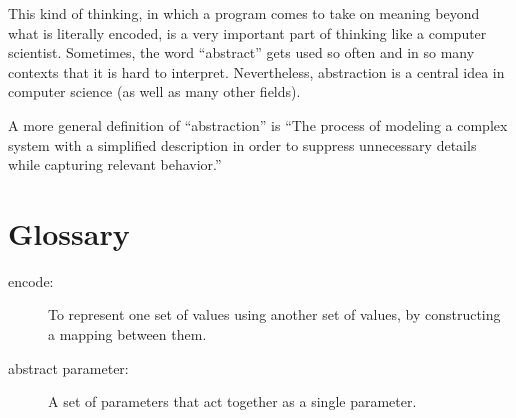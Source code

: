 This kind of thinking, in which a program comes to take on meaning
beyond what is literally encoded, is a very important part of thinking
like a computer scientist.  Sometimes, the word ``abstract'' gets used
so often and in so many contexts that it is hard to interpret.
Nevertheless, abstraction is a central idea in computer science (as
well as many other fields).


A more general definition of ``abstraction'' is ``The process of
modeling a complex system with a simplified description in order to
suppress unnecessary details while capturing relevant behavior.''

\section{Glossary}

\begin{description}

\item[encode:]  To represent one set of values using another
set of values, by constructing a mapping between them.

\item[abstract parameter:]  A set of parameters that act together
as a single parameter.


\end{description}


